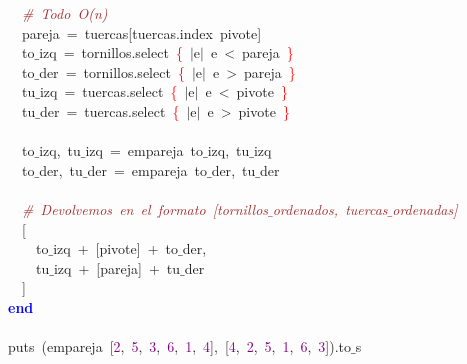 \mbox{}\ \ \textit{\textcolor{Brown}{\#\ Todo\ O(n)}} \\
\mbox{}\ \ pareja\ \textcolor{BrickRed}{=}\ tuercas\textcolor{BrickRed}{[}tuercas\textcolor{BrickRed}{.}index\ pivote\textcolor{BrickRed}{]} \\
\mbox{}\ \ to$\_$izq\ \textcolor{BrickRed}{=}\ tornillos\textcolor{BrickRed}{.}select\ \textcolor{Red}{\{}\ \textcolor{BrickRed}{$|$}e\textcolor{BrickRed}{$|$}\ e\ \textcolor{BrickRed}{\textless{}}\ pareja\ \textcolor{Red}{\}} \\
\mbox{}\ \ to$\_$der\ \textcolor{BrickRed}{=}\ tornillos\textcolor{BrickRed}{.}select\ \textcolor{Red}{\{}\ \textcolor{BrickRed}{$|$}e\textcolor{BrickRed}{$|$}\ e\ \textcolor{BrickRed}{\textgreater{}}\ pareja\ \textcolor{Red}{\}} \\
\mbox{}\ \ tu$\_$izq\ \textcolor{BrickRed}{=}\ tuercas\textcolor{BrickRed}{.}select\ \textcolor{Red}{\{}\ \textcolor{BrickRed}{$|$}e\textcolor{BrickRed}{$|$}\ e\ \textcolor{BrickRed}{\textless{}}\ pivote\ \textcolor{Red}{\}} \\
\mbox{}\ \ tu$\_$der\ \textcolor{BrickRed}{=}\ tuercas\textcolor{BrickRed}{.}select\ \textcolor{Red}{\{}\ \textcolor{BrickRed}{$|$}e\textcolor{BrickRed}{$|$}\ e\ \textcolor{BrickRed}{\textgreater{}}\ pivote\ \textcolor{Red}{\}} \\
\mbox{} \\
\mbox{}\ \ to$\_$izq\textcolor{BrickRed}{,}\ tu$\_$izq\ \textcolor{BrickRed}{=}\ empareja\ to$\_$izq\textcolor{BrickRed}{,}\ tu$\_$izq \\
\mbox{}\ \ to$\_$der\textcolor{BrickRed}{,}\ tu$\_$der\ \textcolor{BrickRed}{=}\ empareja\ to$\_$der\textcolor{BrickRed}{,}\ tu$\_$der \\
\mbox{} \\
\mbox{}\ \ \textit{\textcolor{Brown}{\#\ Devolvemos\ en\ el\ formato\ [tornillos$\_$ordenados,\ tuercas$\_$ordenadas]}} \\
\mbox{}\ \ \textcolor{BrickRed}{[} \\
\mbox{}\ \ \ \ to$\_$izq\ \textcolor{BrickRed}{+}\ \textcolor{BrickRed}{[}pivote\textcolor{BrickRed}{]}\ \textcolor{BrickRed}{+}\ to$\_$der\textcolor{BrickRed}{,} \\
\mbox{}\ \ \ \ tu$\_$izq\ \textcolor{BrickRed}{+}\ \textcolor{BrickRed}{[}pareja\textcolor{BrickRed}{]}\ \textcolor{BrickRed}{+}\ tu$\_$der \\
\mbox{}\ \ \textcolor{BrickRed}{]} \\
\mbox{}\textbf{\textcolor{Blue}{end}} \\
\mbox{} \\
\mbox{}puts\ \textcolor{BrickRed}{(}empareja\ \textcolor{BrickRed}{[}\textcolor{Purple}{2}\textcolor{BrickRed}{,}\ \textcolor{Purple}{5}\textcolor{BrickRed}{,}\ \textcolor{Purple}{3}\textcolor{BrickRed}{,}\ \textcolor{Purple}{6}\textcolor{BrickRed}{,}\ \textcolor{Purple}{1}\textcolor{BrickRed}{,}\ \textcolor{Purple}{4}\textcolor{BrickRed}{],}\ \textcolor{BrickRed}{[}\textcolor{Purple}{4}\textcolor{BrickRed}{,}\ \textcolor{Purple}{2}\textcolor{BrickRed}{,}\ \textcolor{Purple}{5}\textcolor{BrickRed}{,}\ \textcolor{Purple}{1}\textcolor{BrickRed}{,}\ \textcolor{Purple}{6}\textcolor{BrickRed}{,}\ \textcolor{Purple}{3}\textcolor{BrickRed}{]).}to$\_$s
